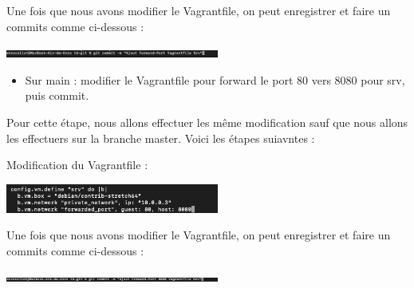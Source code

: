 \documentclass[12pt]{article}
\begin{document}
\vspace{0.3cm}

Une fois que nous avons modifier le Vagrantfile, on peut enregistrer et faire un commits comme ci-dessous : 

\vspace{0.3cm}

\begin{center}
  \includegraphics[width=7cm]{Image-TD-Git-4/commit-1.png}
\end{center}

\vspace{0.3cm}

\begin{itemize}
  \item Sur main : modifier le Vagrantfile pour forward le port 80 vers 8080 pour srv, puis commit.
\end{itemize}

\vspace{0.3cm}

Pour cette étape, nous allons effectuer les même modification sauf que nous allons les effectuers sur la branche master. Voici les étapes suiavntes : 

\vspace{0.3cm}

\vspace{0.3cm}

Modification du Vagrantfile : 

\vspace{0.3cm}

\begin{center}
  \includegraphics[width=7cm]{Image-TD-Git-4/Forward-port-2.png}
\end{center}

\vspace{0.3cm}

Une fois que nous avons modifier le Vagrantfile, on peut enregistrer et faire un commits comme ci-dessous : 

\vspace{0.3cm}

\begin{center}
  \includegraphics[width=7cm]{Image-TD-Git-4/commit-2.png}
\end{center}
\end{document}
